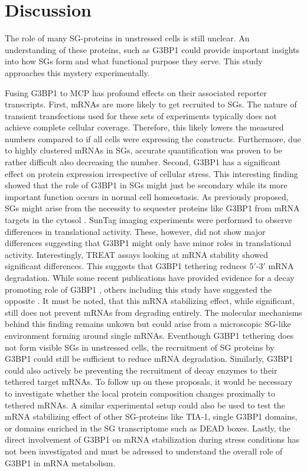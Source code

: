 \chapter{Discussion}


The role of many SG-proteins in unstressed cells is still unclear.
An understanding of these proteins, such as G3BP1 could provide important insights into how SGs form and what functional purpose they serve.
This study approaches this mystery experimentally.

Fusing G3BP1 to MCP has profound effects on their associated reporter transcripts.
First, mRNAs are more likely to get recruited to SGs.
The nature of transient transfections used for these sets of experiments typically does not achieve complete cellular coverage.
Therefore, this likely lowers the measured numbers compared to if all cells were expressing the constructs.
Furthermore, due to highly clustered mRNAs in SGs, accurate quantification was proven to be rather difficult also decreasing the number.
Second, G3BP1 has a significant effect on protein expression irrespective of cellular stress.
This interesting finding showed that the role of G3BP1 in SGs might just be secondary while its more important function occurs in normal cell homeostasis.
As previously proposed, SGs might arise from the necessity to sequester proteins like G3BP1 from mRNA targets in the cytosol \cite{fischer_structure-mediated_2020}.
SunTag imaging experiments were performed to observe differences in translational activity.
These, however, did not show major differences suggesting that G3BP1 might only have minor roles in translational activity.
Interestingly, TREAT assays looking at mRNA stability showed significant differences.
This suggests that G3BP1 tethering reduces 5$'$-3$'$ mRNA degradation.
While some recent publications have provided evidence for a decay promoting role of G3BP1 \cite{fischer_structure-mediated_2020, tourriere_rasgap-associated_2001}, others including this study have suggested the opposite \cite{aulas_g3bp1_2015, bley_stress_2015, laver_rna-binding_2020}.
It must be noted, that this mRNA stabilizing effect, while significant, still does not prevent mRNAs from degrading entirely.
The molecular mechanisms behind this finding remains unkown but could arise from a microscopic SG-like environment forming around single mRNAs.
Eventhough G3BP1 tethering does not form visible SGs in unstressed cells, the recruitment of SG proteins by G3BP1 could still be sufficient to reduce mRNA degradation.
Similarly, G3BP1 could also actively be preventing the recruitment of decay enzymes to their tethered target mRNAs.
To follow up on these proposals, it would be necessary to investigate whether the local protein composition changes proximally to tethered mRNAs.
A similar experimental setup could also be used to test the mRNA stabilizing effect of other SG-proteins like TIA-1, single G3BP1 domains, or domains enriched in the SG transcriptome such as DEAD boxes.
Lastly, the direct involvement of G3BP1 on mRNA stabilization during stress conditions has not been investigated and must be adressed to understand the overall role of G3BP1 in mRNA metabolism.

